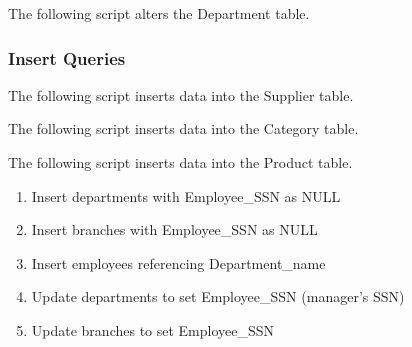 
The following script alters the Department table.


\subsubsection{Insert Queries}


The following script inserts data into the Supplier table.



The following script inserts data into the Category table.



The following script inserts data into the Product table.



\begin{enumerate}[label=Step \arabic*:]
  \item Insert departments with Employee\_SSN as NULL
        
  \item Insert branches with Employee\_SSN as NULL
        
  \item Insert employees referencing Department\_name
        
  \item Update departments to set Employee\_SSN (manager's SSN)
        
  \item Update branches to set Employee\_SSN
        
\end{enumerate}


